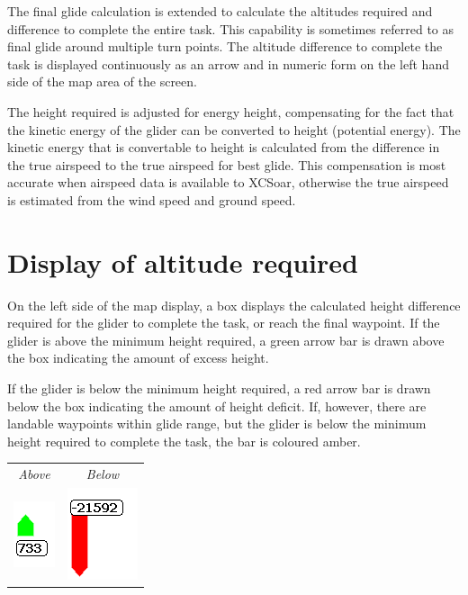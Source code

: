 \documentclass[a4paper,12pt]{refrep}
\begin{document}
The final glide calculation is extended to calculate the altitudes
required and difference to complete the entire task.  This capability
is sometimes referred to as final glide around multiple turn points.
The altitude difference to complete the task is displayed continuously
as an arrow and in numeric form on the left hand side of the map area
of the screen.

The height required is adjusted for energy height, compensating for
the fact that the kinetic energy of the glider can be converted to
height (potential energy).  The kinetic energy that is convertable to
height is calculated from the difference in the true airspeed to the
true airspeed for best glide.  This compensation is most accurate when
airspeed data is available to XCSoar, otherwise the true airspeed is
estimated from the wind speed and ground speed.

\section{Display of altitude required}

On the left side of the map display, a box displays the calculated
height difference required for the glider to complete the task, or
reach the final waypoint.  If the glider is above the minimum height
required, a green arrow bar is drawn above the box indicating the
amount of excess height.

If the glider is below the minimum height required, a red arrow bar is
drawn below the box indicating the amount of height deficit.  If,
however, there are landable waypoints within glide range, but the
glider is below the minimum height required to complete the task, the
bar is coloured amber.

\begin{center}
\begin{tabular}{c c}
{\it Above} & {\it Below} \\
\includegraphics[angle=0,width=0.15\linewidth,keepaspectratio='true']{figures/cut-fg-above.png} &
\includegraphics[angle=0,width=0.2\linewidth,keepaspectratio='true']{figures/cut-fg-below.png} \\
\end{tabular}
\end{center}
\end{document}
